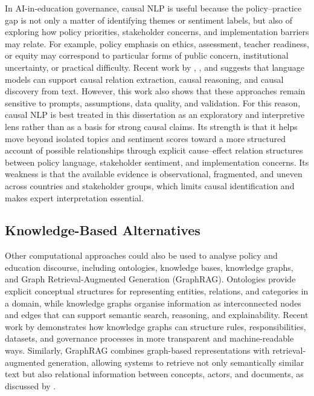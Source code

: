 In AI-in-education governance, causal NLP is useful because the policy--practice gap
is not only a matter of identifying themes or sentiment labels, but also of exploring
how policy priorities, stakeholder concerns, and implementation barriers may relate.
For example, policy emphasis on ethics, assessment, teacher readiness, or equity may
correspond to particular forms of public concern, institutional uncertainty, or
practical difficulty. Recent work by \cite{ma2025causal}, \cite{liu2025large}, and
\cite{wan2025large} suggests that language models can support causal relation
extraction, causal reasoning, and causal discovery from text. However, this work also
shows that these approaches remain sensitive to prompts, assumptions, data quality,
and validation. For this reason, causal NLP is best treated in this dissertation as
an exploratory and interpretive lens rather than as a basis for strong causal claims.
Its strength is that it helps move beyond isolated topics and sentiment scores toward
a more structured account of possible relationships through explicit
cause--effect relation structures between policy language, stakeholder sentiment,
and implementation concerns. Its weakness is that the available evidence is
observational, fragmented, and uneven across countries and stakeholder groups, which
limits causal identification and makes expert interpretation essential.


\subsection{Knowledge-Based Alternatives}

Other computational approaches could also be used to analyse policy and education
discourse, including ontologies, knowledge bases, knowledge graphs, and Graph
Retrieval-Augmented Generation (GraphRAG). Ontologies provide explicit conceptual
structures for representing entities, relations, and categories in a domain, while
knowledge graphs organise information as interconnected nodes and edges that can
support semantic search, reasoning, and explainability. Recent work by
\cite{merono2025knowledge} demonstrates how knowledge graphs can structure rules,
responsibilities, datasets, and governance processes in more transparent and
machine-readable ways. Similarly, GraphRAG combines graph-based representations with
retrieval-augmented generation, allowing systems to retrieve not only semantically
similar text but also relational information between concepts, actors, and documents,
as discussed by \cite{peng2024graphrag}.

